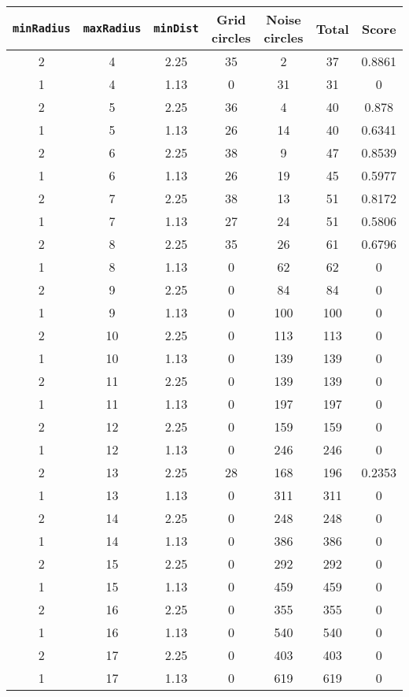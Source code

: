 \documentclass[letterpaper, 12pt]{article}
\begin{document}
\begin{longtable}{|c|c|c|c|c|c|c|}
\hline
\textbf{\texttt{minRadius}} & \textbf{\texttt{maxRadius}} & \textbf{\texttt{minDist}} & \textbf{Grid circles} & \textbf{Noise circles} & \textbf{Total} & \textbf{Score} \\
\hline
2 & 4 & 2.25 & 35 & 2 & 37 & 0.8861 \\
\hline
1 & 4 & 1.13 & 0 & 31 & 31 & 0 \\
\hline
2 & 5 & 2.25 & 36 & 4 & 40 & 0.878 \\
\hline
1 & 5 & 1.13 & 26 & 14 & 40 & 0.6341 \\
\hline
2 & 6 & 2.25 & 38 & 9 & 47 & 0.8539 \\
\hline
1 & 6 & 1.13 & 26 & 19 & 45 & 0.5977 \\
\hline
2 & 7 & 2.25 & 38 & 13 & 51 & 0.8172 \\
\hline
1 & 7 & 1.13 & 27 & 24 & 51 & 0.5806 \\
\hline
2 & 8 & 2.25 & 35 & 26 & 61 & 0.6796 \\
\hline
1 & 8 & 1.13 & 0 & 62 & 62 & 0 \\
\hline
2 & 9 & 2.25 & 0 & 84 & 84 & 0 \\
\hline
1 & 9 & 1.13 & 0 & 100 & 100 & 0 \\
\hline
2 & 10 & 2.25 & 0 & 113 & 113 & 0 \\
\hline
1 & 10 & 1.13 & 0 & 139 & 139 & 0 \\
\hline
2 & 11 & 2.25 & 0 & 139 & 139 & 0 \\
\hline
1 & 11 & 1.13 & 0 & 197 & 197 & 0 \\
\hline
2 & 12 & 2.25 & 0 & 159 & 159 & 0 \\
\hline
1 & 12 & 1.13 & 0 & 246 & 246 & 0 \\
\hline
2 & 13 & 2.25 & 28 & 168 & 196 & 0.2353 \\
\hline
1 & 13 & 1.13 & 0 & 311 & 311 & 0 \\
\hline
2 & 14 & 2.25 & 0 & 248 & 248 & 0 \\
\hline
1 & 14 & 1.13 & 0 & 386 & 386 & 0 \\
\hline
2 & 15 & 2.25 & 0 & 292 & 292 & 0 \\
\hline
1 & 15 & 1.13 & 0 & 459 & 459 & 0 \\
\hline
2 & 16 & 2.25 & 0 & 355 & 355 & 0 \\
\hline
1 & 16 & 1.13 & 0 & 540 & 540 & 0 \\
\hline
2 & 17 & 2.25 & 0 & 403 & 403 & 0 \\
\hline
1 & 17 & 1.13 & 0 & 619 & 619 & 0 \\

\end{longtable}
\end{document}
